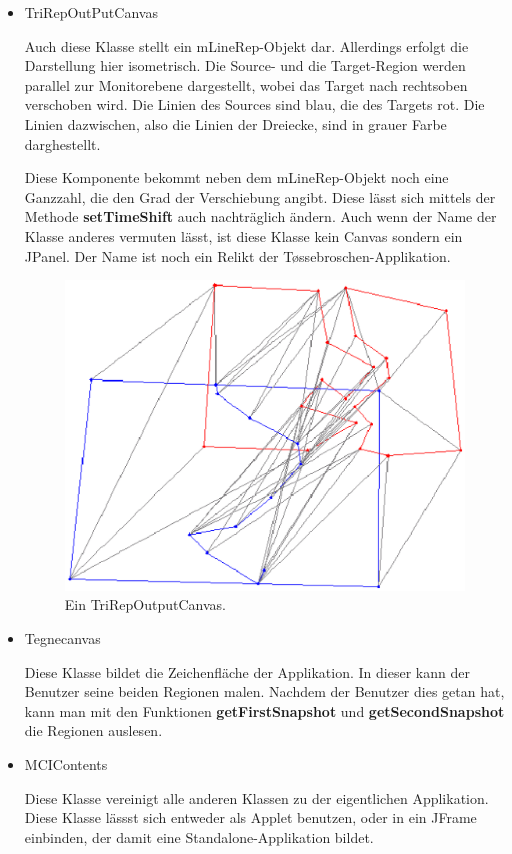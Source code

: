 \begin{itemize}
\item TriRepOutPutCanvas

Auch diese Klasse stellt ein mLineRep-Objekt dar. Allerdings erfolgt die Darstellung hier isometrisch. Die Source- und die Target-Region werden parallel zur Monitorebene dargestellt, wobei das Target nach rechtsoben verschoben wird. Die Linien des Sources sind blau, die des Targets rot. Die Linien dazwischen, also die Linien der Dreiecke, sind in grauer Farbe darghestellt.

Diese Komponente bekommt neben dem mLineRep-Objekt noch eine Ganzzahl, die den Grad der Verschiebung angibt. Diese lässt sich mittels der Methode \textbf{setTimeShift} auch nachträglich ändern. Auch wenn der Name der Klasse anderes vermuten lässt, ist diese Klasse kein Canvas sondern ein JPanel. Der Name ist noch ein Relikt der T\o{}ssebroschen-Applikation.

\begin{figure}
	\centering
	\includegraphics[scale=0.7]{TriRepOutPutCanvas.eps}
	\caption{Ein TriRepOutputCanvas.}
	\label{fig:TriRepOutputCanvas}
\end{figure}




\item Tegnecanvas

Diese Klasse bildet die Zeichenfläche der Applikation. In dieser kann der Benutzer seine beiden Regionen malen. Nachdem der Benutzer dies getan hat, kann man mit den Funktionen \textbf{getFirstSnapshot} und \textbf{getSecondSnapshot} die Regionen auslesen. 

\item MCIContents

Diese Klasse vereinigt alle anderen Klassen zu der eigentlichen Applikation. Diese Klasse lässst sich entweder als Applet benutzen, oder in ein JFrame einbinden, der damit eine Standalone-Applikation bildet.
\end{itemize}

